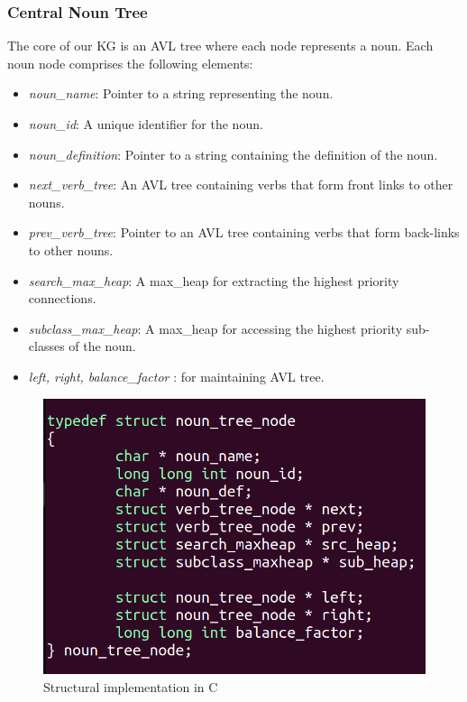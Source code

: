 \documentclass[conference]{IEEEtran}
\begin{document}
\subsubsection{\textbf{Central Noun Tree}}
The core of our KG is an AVL tree where each node represents a noun. Each noun node comprises the following elements:
\begin{itemize}

    \item \textit{noun\_name}: Pointer to a string representing the noun.
    \item \textit{noun\_id}: A unique identifier for the noun.
    \item \textit{noun\_definition}: Pointer to a string containing the definition of the noun.
    \item \textit{next\_verb\_tree}: An AVL tree containing verbs that form front links to other nouns.
    \item \textit{prev\_verb\_tree}: Pointer to an AVL tree containing verbs that form back-links to other nouns.
    \item \textit{search\_max\_heap}: A max\_heap for extracting the highest priority connections.
    \item \textit{subclass\_max\_heap}: A max\_heap for accessing the highest priority sub-classes of the noun.
    \item \textit{left, right, balance\_factor} : for maintaining AVL tree. 
    
\end{itemize}

\begin{figure}[htbp]
\centering
\includegraphics[width=0.8\linewidth]{vi_editor_typedef.png}
\caption{Structural implementation in C}
\label{fig}
\end{figure}
\end{document}
